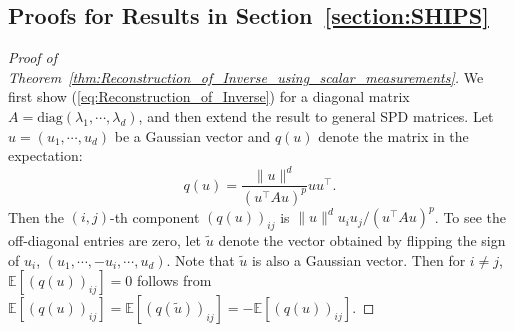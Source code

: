 \subsection{Proofs for Results in Section~\ref{section:SHIPS}}

\begin{proof}[Proof of Theorem~\ref{thm:Reconstruction_of_Inverse_using_scalar_measurements}]
    We first show (\ref{eq:Reconstruction_of_Inverse}) for a diagonal matrix $A = \mathrm{diag}(\lambda_1, \cdots, \lambda_d)$, and then extend the result to general SPD matrices.
    Let $u = (u_1, \cdots, u_d)$ be a Gaussian vector and $q(u)$ denote the matrix in the expectation:
    \[
        q(u) = \frac{\|u\|^{d}}{(u^{\top}Au)^p}uu^{\top}.
    \]
    Then the $(i,j)$-th component $(q(u))_{ij}$ is ${\|u\|^{d} u_i u_j} / {(u^{\top}Au)^p}$.
    To see the off-diagonal entries are zero, let $\tilde{u}$ denote the vector obtained by flipping the sign of $u_i$, $(u_1, \cdots, -u_i, \cdots, u_d)$.
    Note that $\tilde{u}$ is also a Gaussian vector.
    Then for $i\neq j$,  $\mathbb{E}[(q(u))_{ij}] = 0$ follows from $\mathbb{E}[(q(u))_{ij}] = \mathbb{E}[(q(\tilde{u}))_{ij}] = -\mathbb{E}[(q(u))_{ij}]$.


\end{proof}
